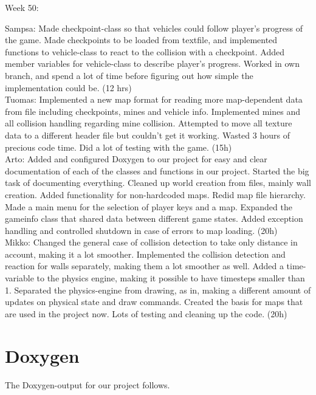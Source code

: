 \documentclass{article} %
\begin{document}
Week 50:

Sampsa: Made checkpoint-class so that vehicles could follow player’s progress of the game. Made checkpoints to be loaded from textfile, and implemented functions to vehicle-class to react to the collision with a checkpoint. Added member variables for vehicle-class to describe player’s progress. Worked in own branch, and spend a lot of time before figuring out how simple the implementation could be. (12 hrs)\\
Tuomas: Implemented a new map format for reading more map-dependent data from file including checkpoints, mines and vehicle info. Implemented mines and all collision handling regarding mine collision. Attempted to move all texture data to a different header file but couldn’t get it working. Wasted 3 hours of precious code time. Did a lot of testing with the game. (15h) \\
Arto: Added and configured Doxygen to our project for easy and clear documentation of each of the classes and functions in our project. Started the big task of documenting everything. Cleaned up world creation from files, mainly wall creation. Added functionality for non-hardcoded maps. Redid map file hierarchy. Made a main menu for the selection of player keys and a map. Expanded the gameinfo class that shared data between different game states. Added exception handling and controlled shutdown in case of errors to map loading. (20h)\\
Mikko: Changed the general case of collision detection to take only distance in account, making it a lot smoother. Implemented the collision detection and reaction for walls separately, making them a lot smoother as well. Added a time-variable to the physics engine, making it possible to have timesteps smaller than 1. Separated the physics-engine from drawing, as in, making a different amount of updates on physical state and draw commands. Created the basis for maps that are used in the project now. Lots of testing and cleaning up the code. (20h)\\

\newpage

\section{Doxygen}

The Doxygen-output for our project follows. 

\newpage


\end{document}

